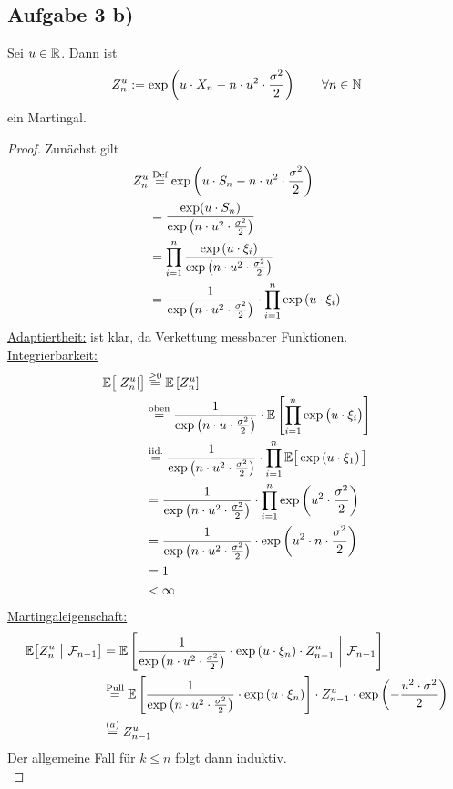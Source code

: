 \documentclass[12pt,a4paper]{article}
\begin{document}
\subsection*{Aufgabe 3 b)}
Sei $u\in\mathbb{R}$. Dann ist
\begin{align*}
Z_n^u:=\exp\left(u\cdot X_n-n\cdot u^2\cdot\frac{\sigma^2}{2}\right)\qquad\forall n\in\mathbb{N}
\end{align*}
ein Martingal.

\begin{proof} Zunächst gilt
\begin{align*}
Z_n^u
&\stackrel{\text{Def}}{=}\exp\left(u\cdot S_n-n\cdot u^2\cdot\frac{\sigma^2}{2}\right)\\
	&= \frac{\exp(u\cdot S_n)}{\exp\left(n\cdot u^2\cdot\frac{\sigma^2}{2}\right)} \\
	&=\prod_{i=1}^n \frac{\exp\left(u\cdot \xi_i\right)}{\exp\left(n\cdot u^2\cdot \frac{\sigma^2}{2}\right)} \\
	&=\frac{1}{\exp\left(n\cdot u^2\cdot \frac{\sigma^2}{2}\right)}\cdot\prod_{i=1}^n \exp\left(u\cdot\xi_i\right)
\end{align*}
\underline{Adaptiertheit:} ist klar, da Verkettung messbarer Funktionen.\\

\underline{Integrierbarkeit:}
\begin{align*}
\mathbb{E}\big[|Z_n^u|\big]
	&\stackrel{\geq0}{=}\mathbb{E}\left[Z^u_n\right]\\ 
	&\stackrel{\text{oben}}{=}
	\frac{1}{\exp\left(n\cdot u\cdot\frac{\sigma^2}{2}\right)}\cdot\mathbb{E}\left[\prod\limits_{i=1}^n \exp\big(u\cdot\xi_i\big)\right]\\
	&\stackrel{\text{iid.}}{=}\frac{1}{\exp\left(n\cdot u^2\cdot\frac{\sigma^2}{2}\right)}\cdot\prod_{i=1}^n \mathbb{E}\big[\exp\left(u\cdot\xi_1\right)\big] \\
	&=\frac{1}{\exp\left(n\cdot u^2\cdot\frac{\sigma^2}{2}\right)}\cdot\prod_{i=1}^n \exp\left(u^2\cdot\frac{\sigma^2}{2}\right) \\
	&=\frac{1}{\exp\left(n\cdot u^2\cdot\frac{\sigma^2}{2}\right)}\cdot \exp\left(u^2\cdot n\cdot\frac{\sigma^2}{2}\right) \\
	&=1 \\
	&<\infty
\end{align*}
\underline{Martingaleigenschaft:}
\begin{align*}
	\mathbb{E}\big[Z_n^u ~\big|~\mathcal{F}_{n-1}\big]
	&=\mathbb{E}\left[\frac{1}{\exp\left(n\cdot u^2\cdot\frac{\sigma^2}{2}\right)}\cdot\exp\left(u\cdot\xi_n\right)\cdot Z^u_{n-1}~\bigg|~\mathcal{F}_{n-1}\right]\\
	&\stackrel{\text{Pull}}{=}
	\mathbb{E}\left[\frac{1}{\exp\left(n\cdot u^2\cdot\frac{\sigma^2}{2}\right)}\cdot\exp\left(u\cdot\xi_n\right)\right]\cdot Z^u_{n-1}\cdot\exp\left(-\frac{u^2\cdot\sigma^2}{2}\right)\\
	&\stackrel{(a)}{=} Z^u_{n-1}
\end{align*}
Der allgemeine Fall für $k\leq n$ folgt dann induktiv.\\


\end{proof}
\end{document}
